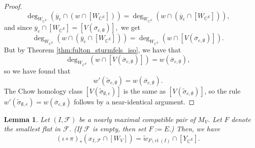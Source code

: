 \documentclass{amsart}
\theoremstyle{plain}
\newtheorem{lemma}[theorem]{Lemma}
\theoremstyle{definition}
\newcommand{\cl}{\operatorname{cl}}
\begin{document}
\begin{proof}
\[\deg_{W_{\mathbb{C}^E}}(\overline{y}_e \cap  (w \cap [W_{\mathbb{C}^E}])) = \deg_{W_{\mathbb{C}^E}}(w \cap  (\overline{y}_e \cap [W_{\mathbb{C}^E}])), \]
and since $\overline{y}_e \cap [W_{\mathbb{C}^E}] = [V(\overline{\sigma}_{e, \emptyset})],$ we get
\[\deg_{W_{\mathbb{C}^E}}(w \cap  (\overline{y}_e \cap [W_{\mathbb{C}^E}])) = \deg_{W_{\mathbb{C}^E}}(w \cap [V(\overline{\sigma}_{e, \emptyset})]).\]
But by Theorem \ref{thm:fulton_sturmfels_iso}, we have that
\[\deg_{W_{\mathbb{C}^E}}(w \cap [V(\overline{\sigma}_{e, \emptyset})]) = w(\overline{\sigma}_{e, \emptyset}),\]
so we have found that
\[w'(\tilde{\sigma}_{e, \emptyset}) = w(\overline{\sigma}_{e,\emptyset}).\]
The Chow homology class $[V(\tilde{\sigma}_{\emptyset, e})]$ is the same as $[V(\tilde{\sigma}_{e, \emptyset})]$,
so the rule $w'(\tilde{\sigma}_{\emptyset, e}) = w(\overline{\sigma}_{e,\emptyset})$ follows by a near-identical argument.    
\end{proof}

\begin{lemma}
\label{lem:pushforward_formula}
Let $(I, \mathscr{F})$ be a nearly maximal compatible pair of $M_V$. Let $F$ denote the smallest flat in $\mathscr{F}$. (If $\mathscr{F}$ is empty, then set $F := E.$) Then, we have
\[(\iota \circ \pi)_*(x_{I,\mathscr{F}} \cap [W_V]) = \tilde{w}_{F \setminus \cl(I)} \cap [Y_{\mathbb{C}^E}].\]
\end{lemma}
\end{document}

